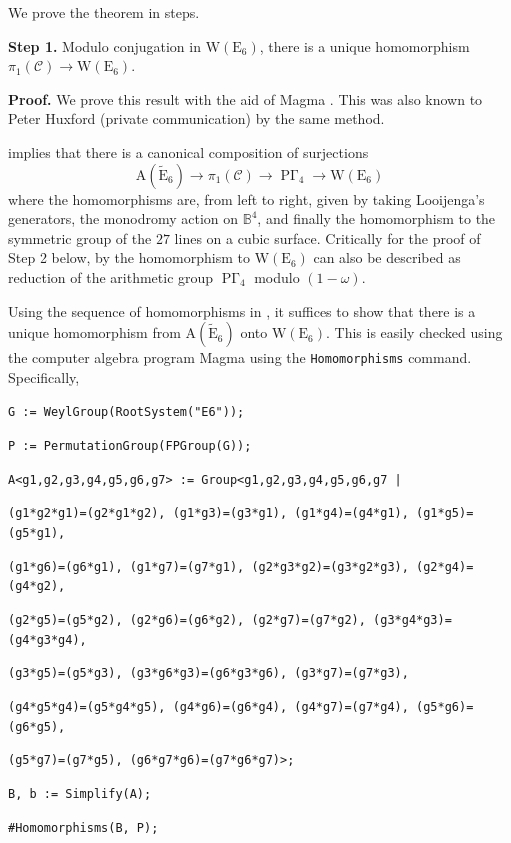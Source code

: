 \documentclass[11pt]{amsart}
\theoremstyle{plain}
\theoremstyle{definition}
\theoremstyle{remark}
\newcommand{\bbB}{\mathbb{B}}
\newcommand{\calC}{\mathcal{C}}
\newcommand{\om}{\omega}
\newcommand{\lra}{\longrightarrow}
\DeclareMathOperator{\PGam}{\mathrm{P}\Gamma}
\begin{document}
We prove the theorem in steps.

\medskip
\noindent\textbf{Step 1.} Modulo conjugation in $\mathrm{W}(\mathrm{E}_6)$, there is a unique homomorphism $\pi_1(\calC)\to\mathrm{W}(\mathrm{E}_6)$.
\smallskip

\noindent
\textbf{Proof.} We prove this result with the aid of Magma \cite{MR1484478}. This was also known to Peter Huxford (private communication) by the same method.

 implies that there is a canonical composition of surjections
\begin{equation}\label{eqarting}
\mathrm{A}(\widetilde{\mathrm{E}}_6) \lra \pi_1(\calC)\lra \PGam_4 \lra \mathrm{W}(\mathrm{E}_6)
\end{equation}
where the homomorphisms are, from left to right, given by taking Looijenga's generators, the monodromy action on $\bbB^4$, and finally the homomorphism to the symmetric group of the $27$ lines on a cubic surface. Critically for the proof of Step 2 below, by \cite[\S 3.12]{ACT} the homomorphism to $\mathrm{W}(\mathrm{E}_6)$ can also be described as reduction of the arithmetic group $\PGam_4$ modulo $(1-\om)$.

Using the sequence of homomorphisms in , it suffices to show that there is a unique homomorphism from $\mathrm{A}(\widetilde{\mathrm{E}}_6)$ onto $\mathrm{W}(\mathrm{E}_6)$. This is easily checked using the computer algebra program Magma using the \texttt{Homomorphisms} command. Specifically,

\medskip

{\scriptsize
\texttt{G := WeylGroup(RootSystem("E6"));}

\texttt{P := PermutationGroup(FPGroup(G));}

\texttt{A<g1,g2,g3,g4,g5,g6,g7> := Group<g1,g2,g3,g4,g5,g6,g7 |}

\texttt{\quad\quad (g1*g2*g1)=(g2*g1*g2), (g1*g3)=(g3*g1), (g1*g4)=(g4*g1), (g1*g5)=(g5*g1),}

\texttt{\quad\quad (g1*g6)=(g6*g1), (g1*g7)=(g7*g1), (g2*g3*g2)=(g3*g2*g3), (g2*g4)=(g4*g2),} 

\texttt{\quad\quad (g2*g5)=(g5*g2), (g2*g6)=(g6*g2), (g2*g7)=(g7*g2), (g3*g4*g3)=(g4*g3*g4),}

\texttt{\quad\quad (g3*g5)=(g5*g3), (g3*g6*g3)=(g6*g3*g6), (g3*g7)=(g7*g3),}

\texttt{\quad\quad (g4*g5*g4)=(g5*g4*g5), (g4*g6)=(g6*g4), (g4*g7)=(g7*g4), (g5*g6)=(g6*g5),} 

\texttt{\quad\quad (g5*g7)=(g7*g5), (g6*g7*g6)=(g7*g6*g7)>;}

\texttt{B, b := Simplify(A);}

\texttt{\#Homomorphisms(B, P);}
}
\end{document}
